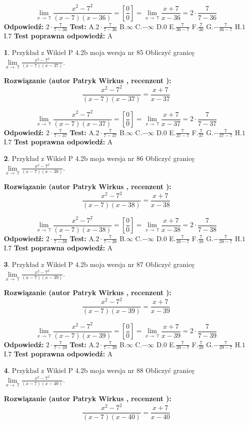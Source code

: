 \documentclass[12pt, a4paper]{article}
\theoremstyle{definition} %
\newtheorem{zad}{}
\newcommand{\zadStart}[1]{\begin{zad}#1\newline}
\newcommand{\zadStop}{\end{zad}}
\newcommand{\rozwStart}[2]{\noindent \textbf{Rozwiązanie (autor #1 , recenzent #2): }\newline}
\newcommand{\rozwStop}{\newline}
\newcommand{\odpStart}{\noindent \textbf{Odpowiedź:}\newline}
\newcommand{\odpStop}{\newline}
\newcommand{\testStart}{\noindent \textbf{Test:}\newline}
\newcommand{\testStop}{\newline}
\newcommand{\kluczStart}{\noindent \textbf{Test poprawna odpowiedź:}\newline}
\newcommand{\kluczStop}{\newline}
\begin{document}
$$\lim\limits_{x\to\ 7}\frac{x^{2}-7^{2}}{(x-7)(x-36)}=[\frac{0}{0}]=\lim\limits_{x\to\ 7}\frac{x+7}{x-36}=2 \cdot \frac{7}{7-36}$$
\rozwStop
\odpStart
$2 \cdot \frac{7}{7-36}$
\odpStop
\testStart
A.$2 \cdot \frac{7}{7-36}$
B.$\infty$
C.$-\infty$
D.$0$
E.$\frac{7}{36-7}$
F.$\frac{7}{36}$
G.$-\frac{7}{36-7}$
H.$1$
I.$7$
\testStop
\kluczStart
A
\kluczStop



\zadStart{Przykład z Wikieł P 4.2b moja wersja nr 85}
Obliczyć granicę $\lim\limits_{x\to\ 7}\frac{x^{2}-7^{2}}{(x-7)(x-37)}$.
\zadStop
\rozwStart{Patryk Wirkus}{}
$$\frac{x^{2}-7^{2}}{(x-7)(x-37)}=\frac{x+7}{x-37}$$

$$\lim\limits_{x\to\ 7}\frac{x^{2}-7^{2}}{(x-7)(x-37)}=[\frac{0}{0}]=\lim\limits_{x\to\ 7}\frac{x+7}{x-37}=2 \cdot \frac{7}{7-37}$$
\rozwStop
\odpStart
$2 \cdot \frac{7}{7-37}$
\odpStop
\testStart
A.$2 \cdot \frac{7}{7-37}$
B.$\infty$
C.$-\infty$
D.$0$
E.$\frac{7}{37-7}$
F.$\frac{7}{37}$
G.$-\frac{7}{37-7}$
H.$1$
I.$7$
\testStop
\kluczStart
A
\kluczStop



\zadStart{Przykład z Wikieł P 4.2b moja wersja nr 86}
Obliczyć granicę $\lim\limits_{x\to\ 7}\frac{x^{2}-7^{2}}{(x-7)(x-38)}$.
\zadStop
\rozwStart{Patryk Wirkus}{}
$$\frac{x^{2}-7^{2}}{(x-7)(x-38)}=\frac{x+7}{x-38}$$

$$\lim\limits_{x\to\ 7}\frac{x^{2}-7^{2}}{(x-7)(x-38)}=[\frac{0}{0}]=\lim\limits_{x\to\ 7}\frac{x+7}{x-38}=2 \cdot \frac{7}{7-38}$$
\rozwStop
\odpStart
$2 \cdot \frac{7}{7-38}$
\odpStop
\testStart
A.$2 \cdot \frac{7}{7-38}$
B.$\infty$
C.$-\infty$
D.$0$
E.$\frac{7}{38-7}$
F.$\frac{7}{38}$
G.$-\frac{7}{38-7}$
H.$1$
I.$7$
\testStop
\kluczStart
A
\kluczStop



\zadStart{Przykład z Wikieł P 4.2b moja wersja nr 87}
Obliczyć granicę $\lim\limits_{x\to\ 7}\frac{x^{2}-7^{2}}{(x-7)(x-39)}$.
\zadStop
\rozwStart{Patryk Wirkus}{}
$$\frac{x^{2}-7^{2}}{(x-7)(x-39)}=\frac{x+7}{x-39}$$

$$\lim\limits_{x\to\ 7}\frac{x^{2}-7^{2}}{(x-7)(x-39)}=[\frac{0}{0}]=\lim\limits_{x\to\ 7}\frac{x+7}{x-39}=2 \cdot \frac{7}{7-39}$$
\rozwStop
\odpStart
$2 \cdot \frac{7}{7-39}$
\odpStop
\testStart
A.$2 \cdot \frac{7}{7-39}$
B.$\infty$
C.$-\infty$
D.$0$
E.$\frac{7}{39-7}$
F.$\frac{7}{39}$
G.$-\frac{7}{39-7}$
H.$1$
I.$7$
\testStop
\kluczStart
A
\kluczStop



\zadStart{Przykład z Wikieł P 4.2b moja wersja nr 88}
Obliczyć granicę $\lim\limits_{x\to\ 7}\frac{x^{2}-7^{2}}{(x-7)(x-40)}$.
\zadStop
\rozwStart{Patryk Wirkus}{}
$$\frac{x^{2}-7^{2}}{(x-7)(x-40)}=\frac{x+7}{x-40}$$
\end{document}
